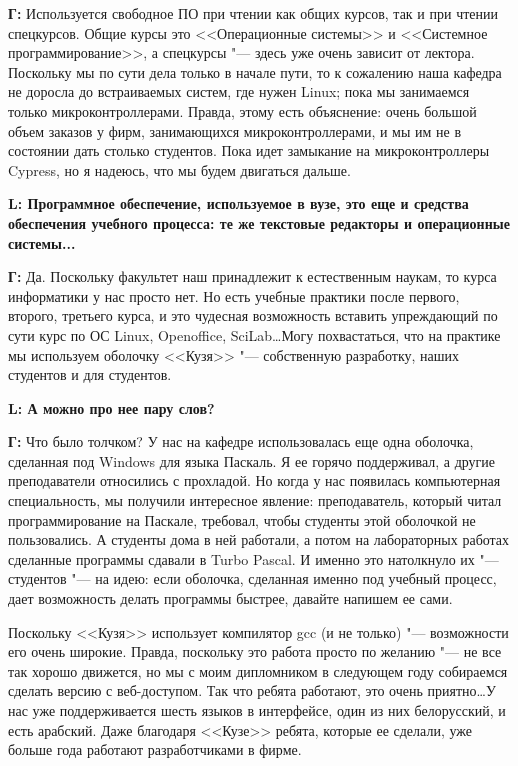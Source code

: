 \documentclass[10pt, a5paper]{article}
\begin{document}
{\noindent \bf Г:} Используется свободное ПО при чтении как общих курсов, так и при чтении спецкурсов. Общие курсы это <<Операционные системы>> и <<Системное программирование>>, а спецкурсы "--- здесь уже очень зависит от лектора. Поскольку мы по сути дела только в начале пути, то к сожалению наша кафедра не доросла до встраиваемых систем, где нужен Linux; пока мы занимаемся только микроконтроллерами. Правда, этому есть объяснение: очень большой объем заказов у фирм, занимающихся микроконтроллерами, и мы им не в состоянии дать столько студентов. Пока идет замыкание на микроконтроллеры Cypress, но я надеюсь, что мы будем двигаться дальше.

{\noindent \bf L: Программное обеспечение, используемое в вузе, это еще и средства обеспечения учебного процесса: те же текстовые редакторы и операционные системы...}

{\noindent \bf Г:} Да. Поскольку факультет наш принадлежит к естественным наукам, то курса информатики у нас просто нет. Но есть учебные практики после первого, второго, третьего курса, и это чудесная возможность вставить упреждающий по сути курс по ОС Linux, Openoffice, SciLab\ldots Могу похвастаться, что на практике мы используем оболочку <<Кузя>> "--- собственную разработку, наших студентов и для студентов.

{\noindent \bf L: А можно про нее пару слов?}

{\noindent \bf Г:}  Что было толчком? У нас на кафедре использовалась еще одна оболочка, сделанная под Windows для языка Паскаль. Я ее горячо поддерживал, а другие преподаватели относились с прохладой. Но когда у нас появилась компьютерная специальность, мы получили интересное явление: преподаватель, который читал программирование на Паскале, требовал, чтобы студенты этой оболочкой не пользовались. А студенты дома в ней работали, а потом на лабораторных работах сделанные программы сдавали в Turbo Pascal. И именно это натолкнуло их "--- студентов "--- на идею: если оболочка, сделанная именно под учебный процесс, дает возможность делать программы быстрее, давайте напишем ее сами. 

Поскольку <<Кузя>> использует компилятор gcc (и не только) "--- возможности его очень широкие. Правда, поскольку это работа просто по желанию "--- не все так хорошо движется, но мы с моим дипломником в следующем году собираемся сделать версию с веб-доступом. Так что ребята работают, это очень приятно\ldots У нас уже поддерживается шесть языков в интерфейсе, один из них белорусский, и есть арабский. Даже благодаря <<Кузе>> ребята, которые ее сделали, уже больше года работают разработчиками в фирме. 
\end{document}
